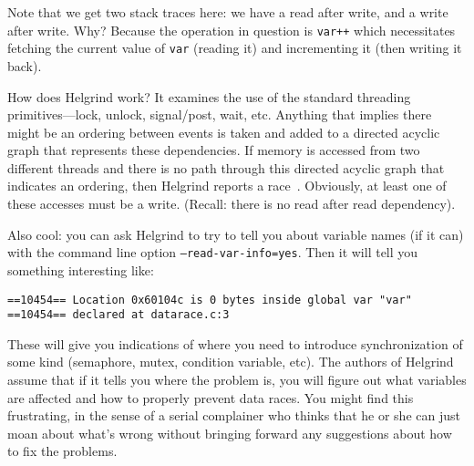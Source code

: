 Note that we get two stack traces here: we have a read after write, and a write after write. Why? Because the operation in question is \texttt{var++} which necessitates fetching the current value of \texttt{var} (reading it) and incrementing it (then writing it back).

How does Helgrind work? It examines the use of the standard threading primitives---lock, unlock, signal/post, wait, etc. Anything that implies there might be an ordering between events is taken and added to a directed acyclic graph that represents these dependencies. If memory is accessed from two different threads and there is no path through this directed acyclic graph that indicates an ordering, then Helgrind reports a race~\cite{helgrind}. Obviously, at least one of these accesses must be a write. (Recall: there is no read after read dependency).

Also cool: you can ask Helgrind to try to tell you about variable names (if it can) with the command line option \texttt{--read-var-info=yes}. Then it will tell you something interesting like:

\begin{lstlisting}
==10454== Location 0x60104c is 0 bytes inside global var "var"
==10454== declared at datarace.c:3
\end{lstlisting}

These will give you indications of where you need to introduce synchronization of some kind (semaphore, mutex, condition variable, etc). The authors of Helgrind assume that if it tells you where the problem is, you will figure out what variables are affected and how to properly prevent data races. You might find this frustrating, in the sense of a serial complainer who thinks that he or she can just moan about what's wrong without bringing forward any suggestions about how to fix the problems. 




